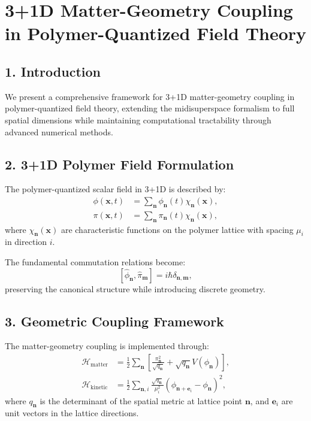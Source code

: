 \documentclass[12pt]{article}
\begin{document}
\section*{3+1D Matter-Geometry Coupling in Polymer-Quantized Field Theory}

\subsection*{1. Introduction}
We present a comprehensive framework for 3+1D matter-geometry coupling in polymer-quantized field theory, extending the midisuperspace formalism to full spatial dimensions while maintaining computational tractability through advanced numerical methods.

\subsection*{2. 3+1D Polymer Field Formulation}
The polymer-quantized scalar field in 3+1D is described by:
\begin{align}
  \phi(\mathbf{x},t) &= \sum_{\mathbf{n}} \phi_{\mathbf{n}}(t) \chi_{\mathbf{n}}(\mathbf{x}), \\
  \pi(\mathbf{x},t) &= \sum_{\mathbf{n}} \pi_{\mathbf{n}}(t) \chi_{\mathbf{n}}(\mathbf{x}),
\end{align}
where $\chi_{\mathbf{n}}(\mathbf{x})$ are characteristic functions on the polymer lattice with spacing $\mu_i$ in direction $i$.

The fundamental commutation relations become:
\[
  [\hat{\phi}_{\mathbf{n}}, \hat{\pi}_{\mathbf{m}}] = i\hbar \delta_{\mathbf{n},\mathbf{m}},
\]
preserving the canonical structure while introducing discrete geometry.

\subsection*{3. Geometric Coupling Framework}
The matter-geometry coupling is implemented through:
\begin{align}
  \mathcal{H}_{\text{matter}} &= \frac{1}{2}\sum_{\mathbf{n}} \left[\frac{\pi_{\mathbf{n}}^2}{\sqrt{q_{\mathbf{n}}}} + \sqrt{q_{\mathbf{n}}} V(\phi_{\mathbf{n}})\right], \\
  \mathcal{H}_{\text{kinetic}} &= \frac{1}{2}\sum_{\mathbf{n},i} \frac{\sqrt{q_{\mathbf{n}}}}{\mu_i^2} (\phi_{\mathbf{n}+\mathbf{e}_i} - \phi_{\mathbf{n}})^2,
\end{align}
where $q_{\mathbf{n}}$ is the determinant of the spatial metric at lattice point $\mathbf{n}$, and $\mathbf{e}_i$ are unit vectors in the lattice directions.
\end{document}
